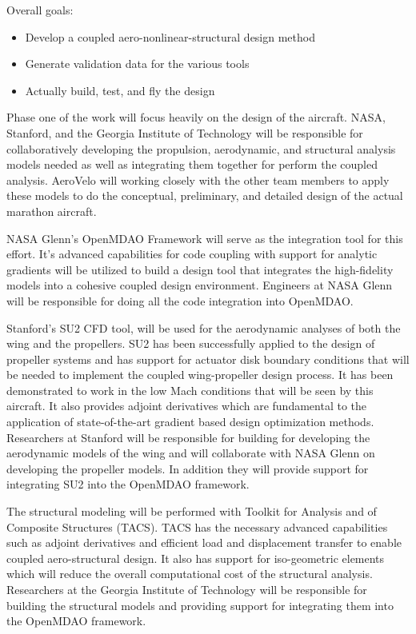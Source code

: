 \documentclass[]{aiaa-tc}
\begin{document}
    Overall goals: 
    \begin{itemize}
        \item Develop a coupled aero-nonlinear-structural design method 
        \item Generate validation data for the various tools 
        \item Actually build, test, and fly the design
    \end{itemize}

    Phase one of the work will focus heavily on the design of the aircraft. NASA, Stanford, 
    and the Georgia Institute of Technology will be responsible for collaboratively developing 
    the propulsion, aerodynamic, and structural analysis models needed as well as integrating them 
    together for perform the coupled analysis. AeroVelo will working closely with the other team members
    to apply these models to do the conceptual, preliminary, and detailed design of the actual 
    marathon aircraft. 

    NASA Glenn's OpenMDAO Framework will serve as the integration tool for this effort. It's advanced 
    capabilities for code coupling with support for analytic gradients will be utilized to build 
    a design tool that integrates the high-fidelity models into a cohesive coupled design environment. 
    Engineers at NASA Glenn will be responsible for doing all the code integration into OpenMDAO. 

    Stanford's SU2 CFD tool, will be used for the aerodynamic analyses of both the wing and 
    the propellers. SU2 has been successfully applied to the design of propeller systems 
    and has support for actuator disk boundary conditions that will be needed to implement 
    the coupled wing­-propeller design process. It has been demonstrated to work in the low 
    Mach conditions that will be seen by this aircraft. It also provides adjoint derivatives 
    which are fundamental to the application of state­-of-­the-­art gradient based design 
    optimization methods. Researchers at Stanford will be responsible for building for developing 
    the aerodynamic models of the wing and will collaborate with NASA Glenn on developing the 
    propeller models. In addition they will provide support for integrating SU2 into the OpenMDAO 
    framework. 

    The structural modeling will be performed with Toolkit for Analysis and of Composite 
    Structures (TACS). TACS has the necessary advanced capabilities such as adjoint derivatives 
    and efficient load and displacement transfer to enable coupled aero­-structural design. It also has 
    support for iso-geometric elements which will reduce the overall computational cost of the 
    structural analysis. Researchers at the Georgia Institute of Technology will be responsible for 
    building the structural models and providing support for integrating them into the OpenMDAO framework. 
\end{document}
